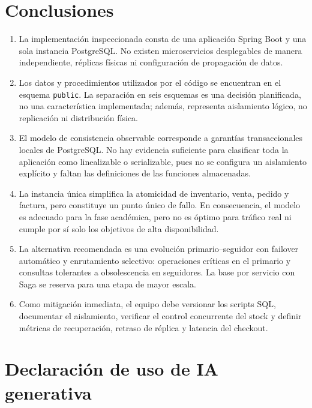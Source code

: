 \documentclass[11pt,a4paper]{article}
\begin{document}
\section{Conclusiones}

\begin{enumerate}[leftmargin=*]
  \item La implementación inspeccionada consta de una aplicación Spring Boot y una sola instancia PostgreSQL. No existen microservicios desplegables de manera independiente, réplicas físicas ni configuración de propagación de datos.
  \item Los datos y procedimientos utilizados por el código se encuentran en el esquema \texttt{public}. La separación en seis esquemas es una decisión planificada, no una característica implementada; además, representa aislamiento lógico, no replicación ni distribución física.
  \item El modelo de consistencia observable corresponde a garantías transaccionales locales de PostgreSQL. No hay evidencia suficiente para clasificar toda la aplicación como linealizable o serializable, pues no se configura un aislamiento explícito y faltan las definiciones de las funciones almacenadas.
  \item La instancia única simplifica la atomicidad de inventario, venta, pedido y factura, pero constituye un punto único de fallo. En consecuencia, el modelo es adecuado para la fase académica, pero no es óptimo para tráfico real ni cumple por sí solo los objetivos de alta disponibilidad.
  \item La alternativa recomendada es una evolución primario--seguidor con failover automático y enrutamiento selectivo: operaciones críticas en el primario y consultas tolerantes a obsolescencia en seguidores. La base por servicio con Saga se reserva para una etapa de mayor escala.
  \item Como mitigación inmediata, el equipo debe versionar los scripts SQL, documentar el aislamiento, verificar el control concurrente del stock y definir métricas de recuperación, retraso de réplica y latencia del checkout.
\end{enumerate}

\section{Declaración de uso de IA generativa}
\end{document}
